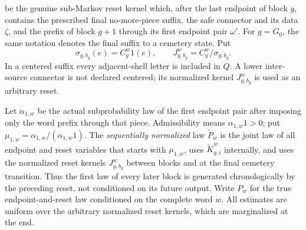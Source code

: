 be the genuine sub-Markov reset kernel which, after the last endpoint
of block \(g\), contains the prescribed final no-more-piece suffix, the
safe connector and its data \(\zeta\), and the prefix of block \(g+1\)
through its first endpoint pair \(\omega'\).  For \(g=G_0\), the same
notation denotes the final suffix to a cemetery state.  Put
\begin{equation}
 \sigma_{g,b_g}(e)=C_g^w1(e),\qquad
 J_{g,b_g}^w=C_g^w/\sigma_{g,b_g}.                          \tag{47d''}\label{eq:tu-47d-doubleprime}
\end{equation}
In a centered suffix every adjacent-shell letter is included in \(Q\).
A lower inter-source connector is not declared centered; its normalized
kernel \(J_{g,b_g}^w\) is used as an arbitrary reset.

Let \(\alpha_{1,w}\) be the actual subprobability law of the first endpoint
pair after imposing only the word prefix through that piece.  Admissibility
means \(\alpha_{1,w}1>0\); put
\(\mu_{1,w}=\alpha_{1,w}/(\alpha_{1,w}1)\).  The
\emph{sequentially normalized} law \(\widetilde P_w\) is the
joint law of all endpoint and reset variables that starts with
\(\mu_{1,w}\), uses \(\widetilde K_{g,i}^w\) internally, and uses the
normalized reset kernels \(J_{g,b_g}^w\) between blocks and at the final
cemetery transition.  Thus the first law of every later block is
generated chronologically by the preceding reset, not conditioned on
its future output.  Write \(P_w\) for the true endpoint-and-reset law
conditioned on the complete word \(w\).  All estimates are uniform over
the arbitrary normalized reset kernels, which are marginalized at the
end.


